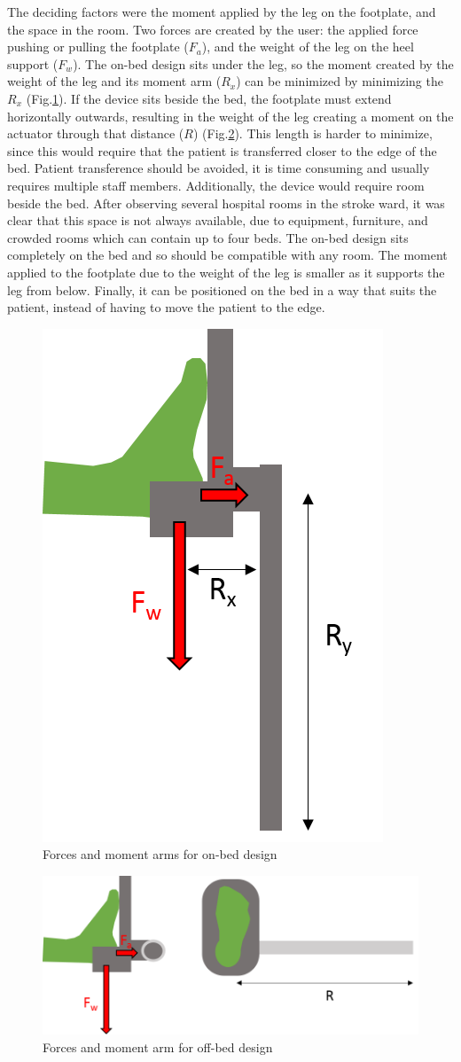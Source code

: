 \documentclass[12pt]{report}
\begin{document}
	The deciding factors were the moment applied by the leg on the footplate, and the space in the room. Two forces are created by the user: the applied force pushing or pulling the footplate ($F_a$), and the weight of the leg on the heel support ($F_w$). The on-bed design sits under the leg, so the moment created by the weight of the leg and its moment arm ($R_x$) can be minimized by minimizing the $R_x$ (Fig.\ref{fig:on-bed_moment}). If the device sits beside the bed, the footplate must extend horizontally outwards, resulting in the weight of the leg creating a moment on the actuator through that distance ($R$) (Fig.\ref{fig:off-bed_moment}). This length is harder to minimize, since this would require that the patient is transferred closer to the edge of the bed. Patient transference should be avoided, it is time consuming and usually requires multiple staff members. Additionally, the device would require room beside the bed. After observing several hospital rooms in the stroke ward, it was clear that this space is not always available, due to equipment, furniture, and crowded rooms which can contain up to four beds. The on-bed design sits completely on the bed and so should be compatible with any room. The moment applied to the footplate due to the weight of the leg is smaller as it supports the leg from below. Finally, it can be positioned on the bed in a way that suits the patient, instead of having to move the patient to the edge. 
	
	\begin{figure}[h] 
		\centering
		\includegraphics[width=0.3\linewidth]{on-bed_moment}
		\caption{Forces and moment arms for on-bed design}
		\label{fig:on-bed_moment}
	\end{figure}
	
	
	\begin{figure}[h] 
		\centering
		\includegraphics[width=0.6\linewidth]{off-bed_moment}
		\caption{Forces and moment arm for off-bed design}
		\label{fig:off-bed_moment}
	\end{figure}
	
\end{document}
